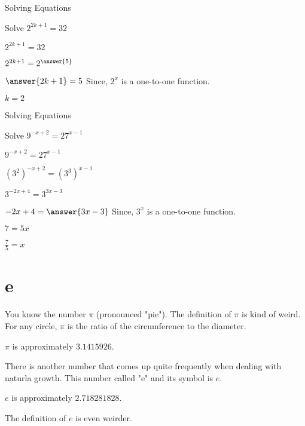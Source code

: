 \documentclass{ximera}
\begin{document}
\begin{example} Solving Equations


Solve $2^{2k+1} = 32$



$2^{2k+1} = 32$

$2^{2k+1} = 2^{\answer{5}}$

$\answer{2k + 1} = 5$    Since, $2^x$ is a one-to-one function.

$k = 2$

\end{example}






\begin{example} Solving Equations


Solve $9^{-x + 2} = 27^{x-1}$




$9^{-x + 2} = 27^{x-1}$

$(3^2)^{-x + 2} = (3^3)^{x-1}$

$3^{-2x+4} = 3^{3x-3}$    

$-2x + 4 = \answer{3x - 3}$    Since, $3^x$ is a one-to-one function.

$7 = 5x$


$\frac{7}{5} = x$

\end{example}














\section{e}


You know the number $\pi$ (pronounced "pie").  The definition of $\pi$ is kind of weird.  For any circle, $\pi$ is the ratio of the circumference to the diameter.

$\pi$ is approximately $3.1415926$.





There is another number that comes up quite frequently when dealing with naturla growth.  This number called "e" and its symbol is $e$.

$e$ is approximately $2.718281828$.

The definition of $e$ is even weirder. \\
\end{document}
